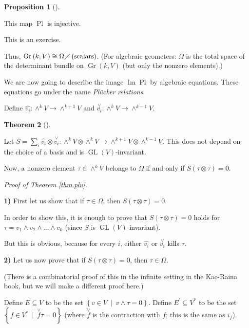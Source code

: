 \documentclass
[numbers=enddot,12pt,final,onecolumn,german,notitlepage]{scrartcl}%
\theoremstyle{definition}
\newtheorem{theo}{Theorem}
\newenvironment{theorem}[1][]
{\begin{theo}[#1]\begin{leftbar}}
{\end{leftbar}\end{theo}}
\newtheorem{prop}[theo]{Proposition}
\newenvironment{proposition}[1][]
{\begin{prop}[#1]\begin{leftbar}}
{\end{leftbar}\end{prop}}
\begin{document}
\begin{proposition}
This map $\operatorname*{Pl}$ is injective.
\end{proposition}

This is an exercise.

Thus, $\operatorname*{Gr}\left(  k,V\right)  \cong\Omega\diagup\left(
\text{scalars}\right)  $. (For algebraic geometers: $\Omega$ is the total
space of the determinant bundle on $\operatorname*{Gr}\left(  k,V\right)  $
(but only the nonzero elements).)

We are now going to describe the image $\operatorname*{Im}\operatorname*{Pl}$
by algebraic equations. These equations go under the name \textit{Pl\"{u}cker
relations}.

Define $\widehat{v_{i}}:\wedge^{k}V\rightarrow\wedge^{k+1}V$ and
$\overset{\vee}{v_{i}}:\wedge^{k}V\rightarrow\wedge^{k-1}V$.

\begin{theorem}
\label{thm.plu}Let $S=\sum\limits_{i}\widehat{v_{i}}\otimes\overset{\vee
}{v_{i}}:\wedge^{k}V\otimes\wedge^{k}V\rightarrow\wedge^{k+1}V\otimes
\wedge^{k-1}V$. This does not depend on the choice of a basis and is
$\operatorname*{GL}\left(  V\right)  $-invariant.

Now, a nonzero element $\tau\in\wedge^{k}V$ belongs to $\Omega$ if and only if
$S\left(  \tau\otimes\tau\right)  =0$.
\end{theorem}

\textit{Proof of Theorem \ref{thm.plu}.}

\textbf{1)} First let us show that if $\tau\in\Omega$, then $S\left(
\tau\otimes\tau\right)  =0$.

In order to show this, it is enough to prove that $S\left(  \tau\otimes
\tau\right)  =0$ holds for $\tau=v_{1}\wedge v_{2}\wedge...\wedge v_{k}$
(since $S$ is $\operatorname*{GL}\left(  V\right)  $-invariant).

But this is obvious, because for every $i$, either $\widehat{v_{i}}$ or
$\overset{\vee}{v_{i}}$ kills $\tau$.

\textbf{2)} Let us now prove that if $S\left(  \tau\otimes\tau\right)  =0$,
then $\tau\in\Omega$.

(There is a combinatorial proof of this in the infinite setting in the
Kac-Raina book, but we will make a different proof here.)

Define $E\subseteq V$ to be the set $\left\{  v\in V\ \mid\ v\wedge
\tau=0\right\}  $. Define $E^{\prime}\subseteq V^{\ast}$ to be the set
$\left\{  f\in V^{\ast}\ \mid\ \overset{\vee}{f}\tau=0\right\}  $ (where
$\overset{\vee}{f}$ is the contraction with $f$; this is the same as $i_{f}$).
\end{document}
